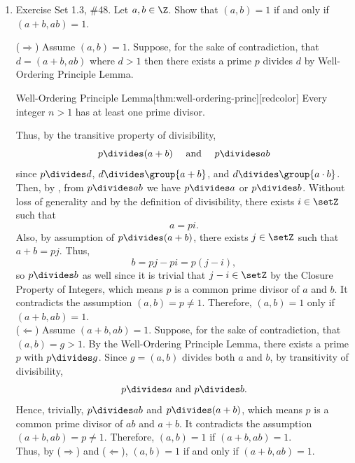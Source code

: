 \begin{enumerate}
  \newpage

  \item Exercise Set 1.3, \#48. Let $a,b\in \Z$. Show that $(a,b)=1$ if and only if $(a+b,ab) = 1$.
  \begin{subprove}
    ($\Rightarrow$) Assume $(a, b)=1$. Suppose, for the sake of contradiction, that 
    $d=(a+b, a b)$ where $d>1$ then there exists a prime $p$ divides $d$ by Well-Ordering 
    Principle Lemma.
    \begin{define}{Well-Ordering Principle Lemma}[thm:well-ordering-princ][redcolor]
    Every integer $n>1$ has at least one prime divisor.
    \end{define}
    Thus, by the transitive property of divisibility,
    $$
    p \divides(a+b) \quad \text { and } \quad p \divides a b
    $$
    since $p \divides d$, $d \divides \group{a+b}$, and $d \divides \group{a\cdot b}$.
    Then, by , from $p \divides ab$ we have $p \divides a$ or $p \divides b$.  
    Without loss of generality and by the definition of divisibility, there exists $i\in\setZ$ such that 
    $$
    a = p i.
    $$
    Also, by assumption of $p\divides(a+b)$, there exists $j\in\setZ$ such that $a+b = pj$. Thus,
    $$
    b = pj - pi = p(j-i),
    $$
    so $p\divides b$ as well since it is trivial that $j-i\in\setZ$ by the Closure Property of Integers, 
    which means $p$ is a common prime divisor of $a$ and $b$.
    It contradicts the assumption $(a,b) = p \ne 1$.
    Therefore, $(a,b)=1$ only if $(a+b,ab) = 1$.\vspace*{10px}\\
    ($\Leftarrow$) Assume $(a+b, a b)=1$. Suppose, for the sake of contradiction, 
    that $(a, b)=g>1$. By the Well-Ordering Principle Lemma, there exists a prime 
    $p$ with $p \divides g$. 
    Since $g=(a, b)$ divides both $a$ and $b$, by transitivity of divisibility,
    $$
    p\divides a \text { and } p \divides b .
    $$
    Hence, trivially, $p \divides a b$ and $p \divides(a+b)$, which means $p$ is a common 
    prime divisor of $a b$ and $a+b$. It contradicts the assumption $(a+b, a b) = p \ne1$.
    Therefore, $(a,b)=1$ if $(a+b,ab) = 1$.\vspace*{10px}\\
    Thus, by ($\Rightarrow$) and ($\Leftarrow$), $(a,b)=1$ if and only if $(a+b,ab) = 1$.
  \end{subprove}

  \newpage


\end{enumerate}
